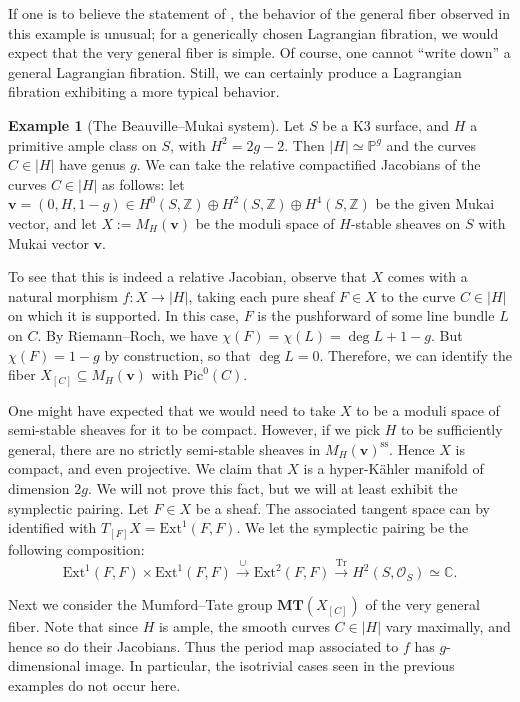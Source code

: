 \documentclass[12pt]{amsart}
\newcommand{\C}{\mathbb{C}}
\newcommand{\Z}{\mathbb{Z}}
\newcommand{\bbP}{\mathbb{P}}
\theoremstyle{definition}
\newtheorem{example}[theorem]{Example}
\numberwithin{equation}{section}
\begin{document}
If one is to believe the statement of , the 
behavior of the general fiber observed in this example is unusual; for a generically 
chosen Lagrangian fibration, we would expect that the very general fiber is simple. 
Of course, one cannot ``write down'' a general Lagrangian fibration. Still, 
we can certainly produce a Lagrangian fibration exhibiting a more typical behavior. 

\begin{example}[The Beauville--Mukai system]
Let \(S\) be a K3 surface, and \(H\) a primitive ample class on \(S\), with \(H^2 = 2g-2\).
Then \(|H| \simeq \bbP^g\) and the curves \(C \in |H|\) have genus \(g\). We can 
take the relative compactified Jacobians of the curves \(C \in |H|\) as follows:
let \(\mathbf{v} = (0, H, 1-g) \in H^0(S, \Z) \oplus H^2(S, \Z) \oplus H^4(S, \Z)\) be 
the given Mukai vector, and let \(X := M_H(\mathbf{v})\) be the moduli space of 
\(H\)-stable sheaves on \(S\) with Mukai vector \(\mathbf{v}\). 

To see that this is indeed a relative Jacobian, observe that \(X\) comes with a 
natural morphism \(f: X \to |H|\), taking each pure sheaf \(F \in X\) to the curve 
\(C \in |H|\) on which it is supported. 
In this case, \(F\) is the pushforward of some line bundle \(L\) on \(C\). 
By Riemann--Roch, we have \(\chi(F) = \chi(L) = \deg L + 1 - g\). But 
\(\chi(F) = 1-g\) by construction, so that \(\deg L = 0\). Therefore, we can 
identify the fiber \(X_{[C]} \subseteq M_H(\mathbf{v})\) with \(\mathrm{Pic}^0(C)\).

One might have expected that we would need to take \(X\) to be a moduli space of 
semi-stable sheaves for it to be compact. However, if we pick \(H\) to be sufficiently 
general, there are no strictly semi-stable sheaves in \(M_H(\mathbf{v})^\mathrm{ss}\).
Hence \(X\) is compact, and even projective. We claim that \(X\) is a hyper-K\"ahler 
manifold of dimension \(2g\). We will not prove this fact, but we will at least exhibit 
the symplectic pairing. Let \(F \in X\) be a sheaf. The associated tangent space can by 
identified with \(T_{[F]} X = \mathrm{Ext}^1(F, F)\). We let the symplectic pairing be 
the following composition:
\begin{equation*}
    \mathrm{Ext}^1(F, F) \times \mathrm{Ext}^1(F, F) \xrightarrow{\cup} 
    \mathrm{Ext}^2(F, F) \xrightarrow{\mathrm{Tr}} H^2(S, \mathcal{O}_S) \simeq \C.
\end{equation*}

Next we consider the Mumford--Tate group \(\mathbf{MT}(X_{[C]})\) of the very general 
fiber. Note that since \(H\) is ample, the smooth curves \(C \in |H|\) vary maximally, 
and hence so do their Jacobians. Thus the period map associated to \(f\) has 
\(g\)-dimensional image. In particular, the isotrivial cases seen in the previous examples
do not occur here. 


\end{example}
\end{document}
